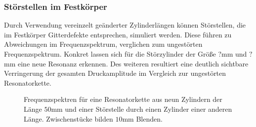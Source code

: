 \subsubsection*{Störstellen im Festkörper}
Durch Verwendung vereinzelt geänderter Zylinderlängen können Störstellen, die im Festkörper Gitterdefekte entsprechen, simuliert werden.
Diese führen zu Abweichungen im Frequenzspektrum, verglichen zum ungestörten Frequenzspektrum.
Konkret lassen sich für die Störzylinder der Größe $?$mm und $?$mm eine neue Resonanz erkennen. Des weiteren resultiert eine
deutlich sichtbare Verringerung der gesamten Druckamplitude im Vergleich zur ungestörten Resonatorkette. 

\begin{figure}[H]
    \centering
    \hfil
    \hfil 
    \caption{Frequenzspektren für eine Resonatorkette aus neun Zylindern der Länge $50$mm und einer Störstelle durch einen Zylinder einer anderen Länge. Zwischenstücke bilden $10$mm Blenden.}
    \label{fig:fest_stoer}
\end{figure}

